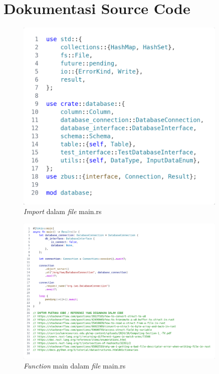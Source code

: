
\appendix

\chapter{Dokumentasi Source Code}

\begin{figure}[H]
  \centering{}
	\includegraphics[width=0.9\textwidth]{gambar/lampiran/file-import-main.png}
  \caption{\emph{Import} dalam \emph{file} main.rs}
\end{figure}

\begin{figure}[H]
  \centering{}
	\includegraphics[width=0.9\textwidth]{gambar/lampiran/file-main-function.png}
  \caption{\emph{Function} main dalam \emph{file} main.rs}
\end{figure}


